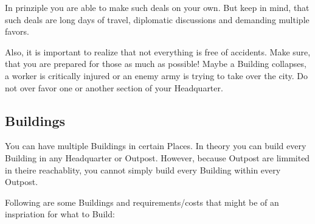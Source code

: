 In prinziple you are able to make such deals on your own. But keep in mind, that such deals are long days of travel, diplomatic discussions and demanding multiple favors.

Also, it is important to realize that not everything is free of accidents. Make sure, that you are prepared for those as much as possible! Maybe a Building collapses, a worker is critically injured or an enemy army is trying to take over the city. Do not over favor one or another section of your Headquarter.

\subsection{Buildings}

You can have multiple Buildings in certain Places. In theory you can build every Building in any Headquarter or Outpost. However, because Outpost are limmited in theire reachablity, you cannot simply build every Building within every Outpost.

Following are some Buildings and requirements/costs that might be of an inspriation for what to Build:


